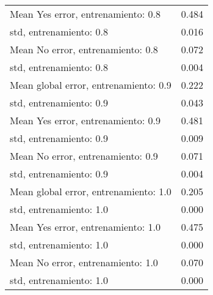 \begin{longtable}{p{4cm}|p{1.5cm}}
Mean Yes error, entrenamiento: 0.8    &                        0.484 \\
std, entrenamiento: 0.8               &                        0.016 \\
Mean No error, entrenamiento: 0.8     &                        0.072 \\
std, entrenamiento: 0.8               &                        0.004 \\
Mean global error, entrenamiento: 0.9 &                        0.222 \\
std, entrenamiento: 0.9               &                        0.043 \\
Mean Yes error, entrenamiento: 0.9    &                        0.481 \\
std, entrenamiento: 0.9               &                        0.009 \\
Mean No error, entrenamiento: 0.9     &                        0.071 \\
std, entrenamiento: 0.9               &                        0.004 \\
Mean global error, entrenamiento: 1.0 &                        0.205 \\
std, entrenamiento: 1.0               &                        0.000 \\
Mean Yes error, entrenamiento: 1.0    &                        0.475 \\
std, entrenamiento: 1.0               &                        0.000 \\
Mean No error, entrenamiento: 1.0     &                        0.070 \\
std, entrenamiento: 1.0               &                        0.000 \\
\end{longtable}
